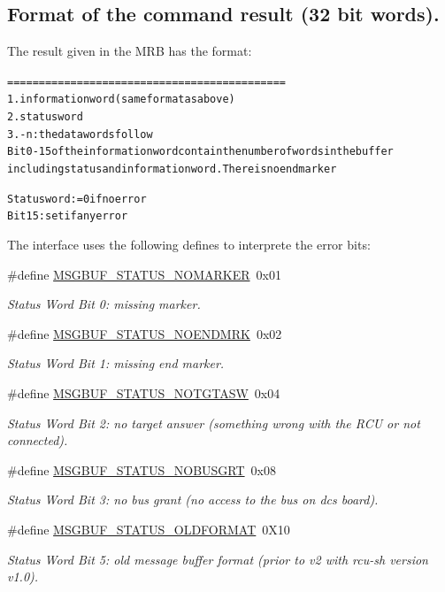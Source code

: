 \subsection*{Format of the command result (32 bit words).}
The result given in the MRB has the format:

\small\begin{alltt}
 ============================================
 1.information word (same format as above)
 2.status word
 3.- n: the data words follow
 Bit 0-15 of the information word contain the number of words in the buffer
          including status and information word. There is no end marker\end{alltt}\normalsize 


\small\begin{alltt} Status word: = 0 if no error
 Bit 15: set if any error
 \end{alltt}\normalsize 
 The interface uses the following defines to interprete the error bits: \begin{CompactItemize}
\item 
\#define \hyperlink{group__dcsc__msg__buffer__access_g08c36f682621c241c61818a20deb25c1}{MSGBUF\_\-STATUS\_\-NOMARKER}~0x01
\begin{CompactList}\small\item\em Status Word Bit 0: missing marker. \item\end{CompactList}\item 
\#define \hyperlink{group__dcsc__msg__buffer__access_gc30e76b52c140c354f56d34019c7f1d2}{MSGBUF\_\-STATUS\_\-NOENDMRK}~0x02
\begin{CompactList}\small\item\em Status Word Bit 1: missing end marker. \item\end{CompactList}\item 
\#define \hyperlink{group__dcsc__msg__buffer__access_g4eee888217162b8a35eb12d67cb4693b}{MSGBUF\_\-STATUS\_\-NOTGTASW}~0x04
\begin{CompactList}\small\item\em Status Word Bit 2: no target answer (something wrong with the RCU or not connected). \item\end{CompactList}\item 
\#define \hyperlink{group__dcsc__msg__buffer__access_g2c69c8f183428cc8448002ccbb40223f}{MSGBUF\_\-STATUS\_\-NOBUSGRT}~0x08
\begin{CompactList}\small\item\em Status Word Bit 3: no bus grant (no access to the bus on dcs board). \item\end{CompactList}\item 
\#define \hyperlink{group__dcsc__msg__buffer__access_g63adfcc12380aecaee776059a90bae31}{MSGBUF\_\-STATUS\_\-OLDFORMAT}~0X10
\begin{CompactList}\small\item\em Status Word Bit 5: old message buffer format (prior to v2 with rcu-sh version v1.0). \item\end{CompactList}\end{CompactItemize}
